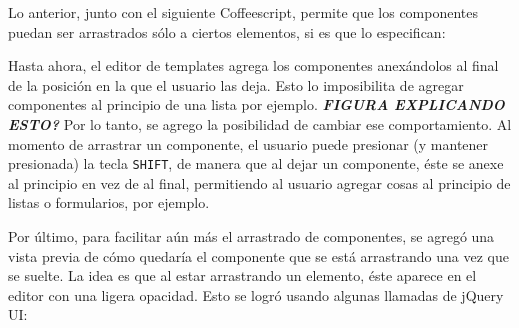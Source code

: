 \documentclass[12pt,titlepage,]{article}
\newenvironment{Shaded}{}{}
\newcommand{\KeywordTok}[1]{\textcolor[rgb]{0.00,0.44,0.13}{\textbf{{#1}}}}
\newcommand{\DataTypeTok}[1]{\textcolor[rgb]{0.56,0.13,0.00}{{#1}}}
\newcommand{\CharTok}[1]{\textcolor[rgb]{0.25,0.44,0.63}{{#1}}}
\newcommand{\StringTok}[1]{\textcolor[rgb]{0.25,0.44,0.63}{{#1}}}
\newcommand{\CommentTok}[1]{\textcolor[rgb]{0.38,0.63,0.69}{\textit{{#1}}}}
\newcommand{\OtherTok}[1]{\textcolor[rgb]{0.00,0.44,0.13}{{#1}}}
\newcommand{\FunctionTok}[1]{\textcolor[rgb]{0.02,0.16,0.49}{{#1}}}
\newcommand{\NormalTok}[1]{{#1}}
\begin{document}
Lo anterior, junto con el siguiente Coffeescript, permite que los
componentes puedan ser arrastrados sólo a ciertos elementos, si es que
lo especifican:

\begin{Shaded}
\end{Shaded}

Hasta ahora, el editor de templates agrega los componentes anexándolos
al final de la posición en la que el usuario las deja. Esto lo
imposibilita de agregar componentes al principio de una lista por
ejemplo. \textbf{\emph{FIGURA EXPLICANDO ESTO?}} Por lo tanto, se agrego
la posibilidad de cambiar ese comportamiento. Al momento de arrastrar un
componente, el usuario puede presionar (y mantener presionada) la tecla
\texttt{SHIFT}, de manera que al dejar un componente, éste se anexe al
principio en vez de al final, permitiendo al usuario agregar cosas al
principio de listas o formularios, por ejemplo.

Por último, para facilitar aún más el arrastrado de componentes, se
agregó una vista previa de cómo quedaría el componente que se está
arrastrando una vez que se suelte. La idea es que al estar arrastrando
un elemento, éste aparece en el editor con una ligera opacidad. Esto se
logró usando algunas llamadas de jQuery UI:

\begin{Shaded}
\end{Shaded}
\end{document}
